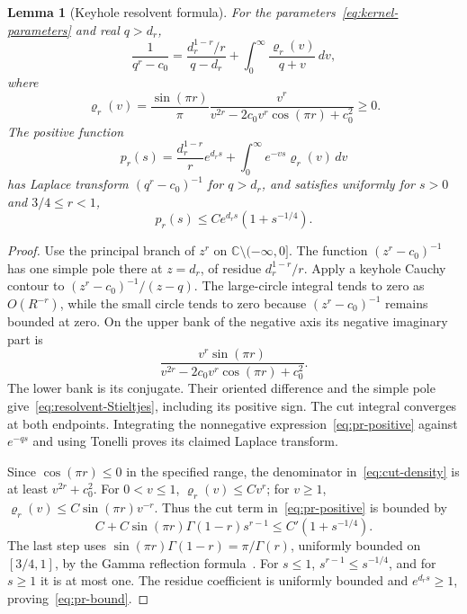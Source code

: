 \documentclass[11pt,a4paper]{article}
\numberwithin{equation}{section}
\newtheorem{lemma}[theorem]{Lemma}
\theoremstyle{definition}
\theoremstyle{remark}
\newcommand{\C}{\mathbb C}
\begin{document}
\begin{lemma}[Keyhole resolvent formula]\label{lem:keyhole}
For the parameters~\eqref{eq:kernel-parameters} and real $q>d_r$,
\begin{equation}\label{eq:resolvent-Stieltjes}
 \frac1{q^r-c_0}
 =\frac{d_r^{1-r}/r}{q-d_r}
   +\int_0^\infty\frac{\varrho_r(v)}{q+v}\,dv,
\end{equation}
where
\begin{equation}\label{eq:cut-density}
 \varrho_r(v)=\frac{\sin(\pi r)}{\pi}
 \frac{v^r}{v^{2r}-2c_0v^r\cos(\pi r)+c_0^2}\ge0.
\end{equation}
The positive function
\begin{equation}\label{eq:pr-positive}
 p_r(s)=\frac{d_r^{1-r}}r e^{d_rs}
             +\int_0^\infty e^{-vs}\varrho_r(v)\,dv
\end{equation}
has Laplace transform $(q^r-c_0)^{-1}$ for $q>d_r$, and satisfies uniformly for $s>0$ and $3/4\le r<1$,
\begin{equation}\label{eq:pr-bound}
 p_r(s)\le C e^{d_rs}(1+s^{-1/4}).
\end{equation}
\end{lemma}
\begin{proof}
Use the principal branch of $z^r$ on $\C\setminus(-\infty,0]$. The function $(z^r-c_0)^{-1}$ has one simple pole there at $z=d_r$, of residue $d_r^{1-r}/r$. Apply a keyhole Cauchy contour to
$(z^r-c_0)^{-1}/(z-q)$. The large-circle integral tends to zero as $O(R^{-r})$, while the small circle tends to zero because $(z^r-c_0)^{-1}$ remains bounded at zero. On the upper bank of the negative axis its negative imaginary part is
\[
 \frac{v^r\sin(\pi r)}
 {v^{2r}-2c_0v^r\cos(\pi r)+c_0^2}.
\]
The lower bank is its conjugate. Their oriented difference and the simple pole give~\eqref{eq:resolvent-Stieltjes}, including its positive sign. The cut integral converges at both endpoints. Integrating the nonnegative expression~\eqref{eq:pr-positive} against $e^{-qs}$ and using Tonelli proves its claimed Laplace transform.

Since $\cos(\pi r)\le0$ in the specified range, the denominator in~\eqref{eq:cut-density} is at least $v^{2r}+c_0^2$. For $0<v\le1$, $\varrho_r(v)\le C v^r$; for $v\ge1$,
$\varrho_r(v)\le C\sin(\pi r)v^{-r}$. Thus the cut term in~\eqref{eq:pr-positive} is bounded by
\[
 C+C\sin(\pi r)\Gamma(1-r)s^{r-1}
 \le C'(1+s^{-1/4}).
\]
The last step uses
$\sin(\pi r)\Gamma(1-r)=\pi/\Gamma(r)$, uniformly bounded on $[3/4,1]$, by the Gamma reflection formula~\cite[Eq.~5.5.3]{DLMFreflection}. For $s\le1$, $s^{r-1}\le s^{-1/4}$, and for $s\ge1$ it is at most one. The residue coefficient is uniformly bounded and $e^{d_rs}\ge1$, proving~\eqref{eq:pr-bound}.
\end{proof}
\end{document}
